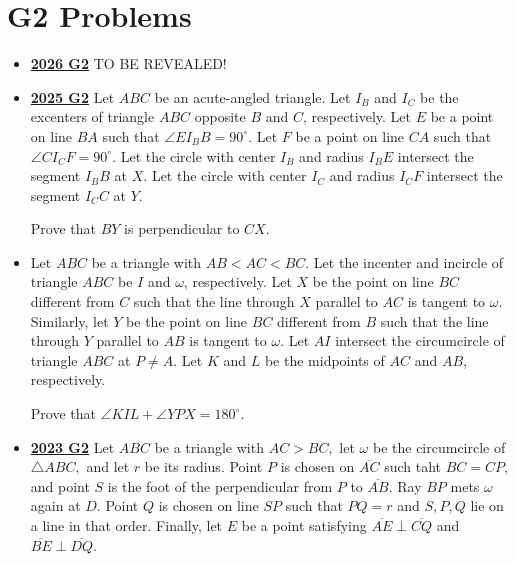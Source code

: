 \documentclass[11pt]{scrartcl}
\begin{document}
\section*{G2 Problems}  \label{G2}
\begin{itemize}[leftmargin=*]


\item \href{https://www.imo-official.org/assets/documents/problems/2026/IMO2026SL.pdf}{\textbf{2026 G2}} TO BE REVEALED!

\item \href{https://artofproblemsolving.com/community/c6h3866847p38676931}{\textbf{2025 G2}} Let $ABC$ be an acute-angled triangle. Let $I_B$ and $I_C$ be the excenters of triangle $ABC$ opposite $B$ and $C$, respectively. Let $E$ be a point on line $BA$ such that $\angle EI_BB=90^\circ$. Let $F$ be a point on line $CA$ such that $\angle CI_CF=90^\circ$. Let the circle with center $I_B$ and radius $I_BE$ intersect the segment $I_BB$ at $X$. Let the circle with center $I_C$ and radius $I_CF$ intersect the segment $I_CC$ at $Y$. 
    
Prove that $BY$ is perpendicular to $CX$.



\item {} Let $ABC$ be a triangle with $AB < AC < BC$. Let the incenter and incircle of triangle $ABC$ be $I$ and $\omega$, respectively. Let $X$ be the point on line $BC$ different from $C$ such that the line through $X$ parallel to $AC$ is tangent to $\omega$. Similarly, let $Y$ be the point on line $BC$ different from $B$ such that the line through $Y$ parallel to $AB$ is tangent to $\omega$. Let $AI$ intersect the circumcircle of triangle $ABC$ at $P \ne A$. Let $K$ and $L$ be the midpoints of $AC$ and $AB$, respectively.

Prove that $\angle KIL + \angle YPX = 180^{\circ}$.
\item \href{https://artofproblemsolving.com/community/c6h3359729p31218382}{\textbf{2023 G2}} Let $ABC$ be a triangle with $AC > BC,$ let $\omega$ be the circumcircle of $\triangle ABC,$ and let $r$ be its radius. Point $P$ is chosen on $\overline{AC}$ such taht $BC=CP,$ and point $S$ is the foot of the perpendicular from $P$ to $\overline{AB}$. Ray $BP$ mets $\omega$ again at $D$. Point $Q$ is chosen on line $SP$ such that $PQ = r$ and $S,P,Q$ lie on a line in that order. Finally, let $E$ be a point satisfying $\overline{AE} \perp \overline{CQ}$ and $\overline{BE} \perp \overline{DQ}$. 


\end{itemize}
\end{document}

